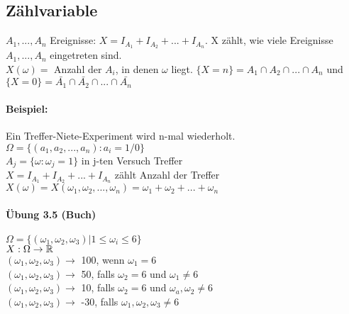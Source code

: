 \subsection{Zählvariable}

$ A_1, ..., A_n $ Ereignisse: $ X=I_{A_1} + I_{A_2} + ... + I_{A_n} $. X zählt, wie viele Ereignisse $A_1, ..., A_n$ eingetreten sind. \\
$ X(\omega) = $ Anzahl der $A_i$, in denen $\omega$ liegt. $ \{X=n\} = A_1\cap A_2\cap ...\cap A_n$ und $ \{X=0\} = \bar{A_1} \cap \bar{A_2} \cap ... \cap \bar{A_n} $

\paragraph{Beispiel:} Ein Treffer-Niete-Experiment wird n-mal wiederholt. \\
$ \Omega=\{(a_1,a_2,...,a_n) : a_i=1/0 \} $\\
$ A_j = \{\omega : \omega_j=1\} $ in j-ten Versuch Treffer\\
$ X=I_{A_1} + I_{A_2} + ... + I_{A_n} $ zählt Anzahl der Treffer\\
$ X(\omega) = X(\omega_1, \omega_2, ..., \omega_n) = \omega_1 + \omega_2 + ... + \omega_n $

\paragraph{Übung 3.5 (Buch)}
$ \Omega = \{ ( \omega_1, \omega_2, \omega_3 ) | 1 \leq \omega_i \leq 6 \} $\\
$ X: \Omega \rightarrow \mathbb{R} $\\
$ (\omega_1, \omega_2, \omega_3) \rightarrow $ 100, wenn $\omega_1=6$\\
$ (\omega_1, \omega_2, \omega_3) \rightarrow $ 50, falls $\omega_2=6$ und $\omega_1 \neq 6$\\
$ (\omega_1, \omega_2, \omega_3) \rightarrow $ 10, falls $\omega_2 = 6$ und $\omega_a, \omega_2\neq 6$\\
$ (\omega_1, \omega_2, \omega_3) \rightarrow $ -30, falls $\omega_1, \omega_2, \omega_3\neq 6$\\
